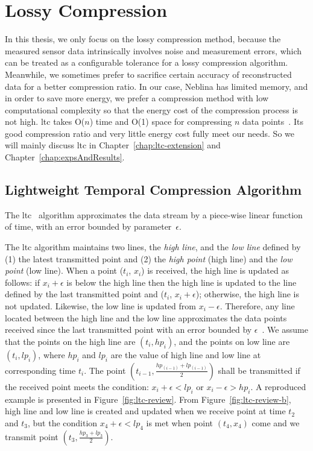 \section{Lossy Compression}
\label{sec:lossy}

In this thesis, we only focus on the lossy compression method, because the
measured sensor data intrinsically involves noise and measurement errors, which
can be treated as a configurable tolerance for a lossy compression algorithm.
Meanwhile, we sometimes prefer to sacrifice certain accuracy of reconstructed
data for a better compression ratio. In our case, Neblina has limited memory,
and in order to save more energy, we prefer a compression method with low
computational complexity so that the energy cost of the compression process is
not high. \acrshort{ltc} takes O($n$) time and O(1) space for compressing $n$
data points~\cite{schoellhammer2004lightweight}. Its good compression ratio and
very little energy cost fully meet our needs. So we will mainly discuss
\acrshort{ltc} in Chapter~\ref{chap:ltc-extension} and
Chapter~\ref{chap:expsAndResults}. 
\subsection{Lightweight Temporal Compression Algorithm}
\label{sec:ltc}

The \acrfull{ltc}~\cite{schoellhammer2004lightweight}
algorithm approximates the data stream by a piece-wise linear function of time,
with an error bounded by parameter~$\epsilon$.

The \acrshort{ltc} algorithm maintains two lines, the \emph{high line}, and the
\emph{low line} defined by (1) the latest transmitted point and (2) the
\emph{high point} (high line) and the \emph{low point} (low line). When a point
($t_i$, $x_i$) is received, the high line is updated as follows: if
$x_i+\epsilon$ is below the high line then the high line is updated to the line
defined by the last transmitted point and ($t_i$, $x_i+\epsilon$); otherwise,
the high line is not updated. Likewise, the low line is updated from
$x_i-\epsilon$. Therefore, any line located between the high line and the low
line approximates the data points received since the last transmitted point with
an error bounded by $\epsilon$~\cite{schoellhammer2004lightweight}. We assume
that the points on the high line are $(t_i, hp_i)$, and the points on low line
are $(t_i, lp_i)$, where $hp_i$ and $lp_i$ are the value of high line and low
line at corresponding time $t_i$.
The point $(t_{i-1}, \frac{hp_{(i-1)}+lp_{(i-1)}}{2})$ shall be transmitted if
the received point meets the condition:
$x_i+\epsilon < lp_{i}$ or $x_i-\epsilon > hp_{i}$. A reproduced example is
presented in Figure~\ref{fig:ltc-review}. From Figure~\ref{fig:ltc-review-b},
high line and low line is created and updated when we receive point at time
$t_2$ and $t_3$, but the condition $x_4+\epsilon < lp_{4}$ is met when point
$(t_4, x_4)$ come and we transmit point $(t_3, \frac{hp_{3}+lp_{3}}{2})$.

